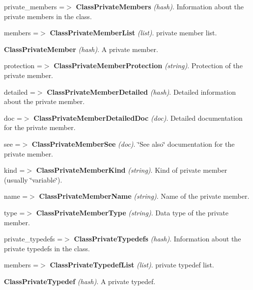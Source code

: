 \begin{DoxyItemize}
\begin{DoxyItemize}
\begin{DoxyItemize}
\begin{DoxyItemize}
\item private\_\-members =$>$ {\bfseries ClassPrivateMembers} {\itshape (hash)\/}. Information about the private members in the class. 
\begin{DoxyItemize}
\item members =$>$ {\bfseries ClassPrivateMemberList} {\itshape (list)\/}. private member list. 
\begin{DoxyItemize}
\item {\bfseries ClassPrivateMember} {\itshape (hash)\/}. A private member. 
\begin{DoxyItemize}
\item protection =$>$ {\bfseries ClassPrivateMemberProtection} {\itshape (string)\/}. Protection of the private member. 
\item detailed =$>$ {\bfseries ClassPrivateMemberDetailed} {\itshape (hash)\/}. Detailed information about the private member. 
\begin{DoxyItemize}
\item doc =$>$ {\bfseries ClassPrivateMemberDetailedDoc} {\itshape (doc)\/}. Detailed documentation for the private member. 
\item see =$>$ {\bfseries ClassPrivateMemberSee} {\itshape (doc)\/}. \char`\"{}See also\char`\"{} documentation for the private member. 
\end{DoxyItemize}
\item kind =$>$ {\bfseries ClassPrivateMemberKind} {\itshape (string)\/}. Kind of private member (usually \char`\"{}variable\char`\"{}). 
\item name =$>$ {\bfseries ClassPrivateMemberName} {\itshape (string)\/}. Name of the private member. 
\item type =$>$ {\bfseries ClassPrivateMemberType} {\itshape (string)\/}. Data type of the private member. 
\end{DoxyItemize}
\end{DoxyItemize}
\end{DoxyItemize}
\item private\_\-typedefs =$>$ {\bfseries ClassPrivateTypedefs} {\itshape (hash)\/}. Information about the private typedefs in the class. 
\begin{DoxyItemize}
\item members =$>$ {\bfseries ClassPrivateTypedefList} {\itshape (list)\/}. private typedef list. 
\begin{DoxyItemize}
\item {\bfseries ClassPrivateTypedef} {\itshape (hash)\/}. A private typedef. 
\begin{DoxyItemize}

\end{DoxyItemize}
\end{DoxyItemize}
\end{DoxyItemize}
\end{DoxyItemize}
\end{DoxyItemize}
\end{DoxyItemize}
\end{DoxyItemize}
